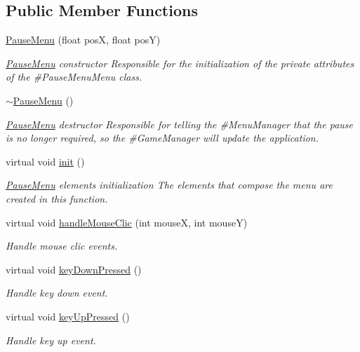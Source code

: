 \subsection*{Public Member Functions}
\begin{DoxyCompactItemize}
\item 
\hyperlink{class_symp_1_1_pause_menu_a2b33d027cab75b41f900d4015b314916}{Pause\-Menu} (float pos\-X, float pos\-Y)
\begin{DoxyCompactList}\small\item\em \hyperlink{class_symp_1_1_pause_menu}{Pause\-Menu} constructor Responsible for the initialization of the private attributes of the \#\-Pause\-Menu\-Menu class. \end{DoxyCompactList}\item 
\hyperlink{class_symp_1_1_pause_menu_a4f960c6e1b391025fc64a59e65fd2f73}{$\sim$\-Pause\-Menu} ()
\begin{DoxyCompactList}\small\item\em \hyperlink{class_symp_1_1_pause_menu}{Pause\-Menu} destructor Responsible for telling the \#\-Menu\-Manager that the pause is no longer required, so the \#\-Game\-Manager will update the application. \end{DoxyCompactList}\item 
virtual void \hyperlink{class_symp_1_1_pause_menu_af456bb275fc71d5a9ee3290e5d82cd90}{init} ()
\begin{DoxyCompactList}\small\item\em \hyperlink{class_symp_1_1_pause_menu}{Pause\-Menu} elements initialization The elements that compose the menu are created in this function. \end{DoxyCompactList}\item 
virtual void \hyperlink{class_symp_1_1_pause_menu_a2a4fd25c988e7b2db561af0f76449cda}{handle\-Mouse\-Clic} (int mouse\-X, int mouse\-Y)
\begin{DoxyCompactList}\small\item\em Handle mouse clic events. \end{DoxyCompactList}\item 
virtual void \hyperlink{class_symp_1_1_pause_menu_af20fcbac9585f1e34eef8de5c84bf9e3}{key\-Down\-Pressed} ()
\begin{DoxyCompactList}\small\item\em Handle key down event. \end{DoxyCompactList}\item 
virtual void \hyperlink{class_symp_1_1_pause_menu_ab6329d721b22dfb991e794768e0d5afd}{key\-Up\-Pressed} ()
\begin{DoxyCompactList}\small\item\em Handle key up event. \end{DoxyCompactList}\end{DoxyCompactItemize}


